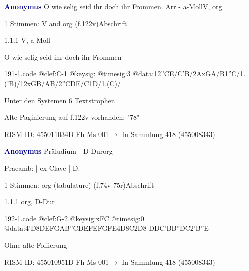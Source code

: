 \documentclass[twocolumn]{book}
\begin{document}
\par \vspace{7pt} \textcolor{darkblue}{\textbf{Anonymus  }}\hfillplus{\textbf{[191]}}\newline O wie selig seid ihr doch ihr Frommen. Arr - a-Moll\newline V, org
\par \begin{itshape}\end{itshape} 
\par \textcolor{darkblue}{}  1 Stimmen: V and org  (f.122v)\newline Abschrift
\par 1.1.1  V, a-Moll\newline \begin{footnotesize} O wie selig seid ihr doch ihr Frommen \end{footnotesize}  
\begin{filecontents*}{191-1.code}
@clef:C-1
@keysig:
@timesig:3
@data:12''CE/C'B/2AxGA/B1''C/1.('B)/12xGB/AB/2''CDE/C1D/1.(C)/
\end{filecontents*}
\newline
%
\par Unter den Systemen 6 Textstrophen
\par Alte Paginierung auf f.122v vorhanden: "78"
\par RISM-ID: 455011034\newline D-Fh  Ms 001\newline $\rightarrow$ In Sammlung 418 (455008343)
      
\par \vspace{7pt} \textcolor{darkblue}{\textbf{Anonymus  }}\hfillplus{\textbf{[192]}}\newline Präludium - D-Dur\newline org
\par \begin{itshape}[f.74v, at left:] Praeamb: | ex Clave | D.\end{itshape} 
\par \textcolor{darkblue}{}  1 Stimmen: org (tabulature)  (f.74v-75r)\newline Abschrift
\par 1.1.1  org, D-Dur  
\begin{filecontents*}{192-1.code}
@clef:G-2
@keysig:xFC
@timesig:0
@data:4'D{8DE}{FGAB}{''CDEF}{EFGF}E4D8C2D8-{DDC}{'BB''DC}2'B''E
\end{filecontents*}
\newline
%
\par Ohne alte Foliierung
\par RISM-ID: 455010951\newline D-Fh  Ms 001\newline $\rightarrow$ In Sammlung 418 (455008343)
      
\end{document}
